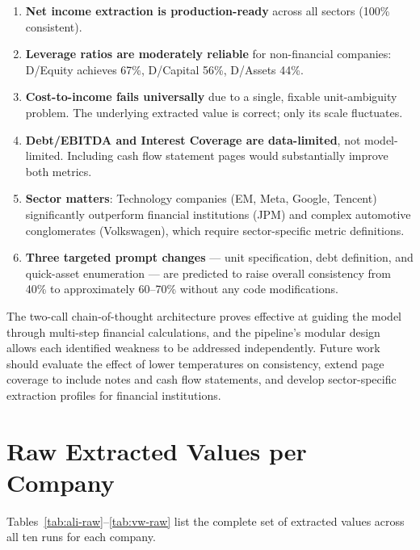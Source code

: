 \documentclass[12pt, a4paper]{article}
\begin{document}
\begin{enumerate}
  \item \textbf{Net income extraction is production-ready} across all sectors
        (100\% consistent).
  \item \textbf{Leverage ratios are moderately reliable} for non-financial
        companies: D/Equity achieves 67\%, D/Capital 56\%, D/Assets 44\%.
  \item \textbf{Cost-to-income fails universally} due to a single, fixable
        unit-ambiguity problem.  The underlying extracted value is correct;
        only its scale fluctuates.
  \item \textbf{Debt/EBITDA and Interest Coverage are data-limited}, not
        model-limited.  Including cash flow statement pages would
        substantially improve both metrics.
  \item \textbf{Sector matters}: Technology companies (EM, Meta, Google,
        Tencent) significantly outperform financial institutions (JPM) and
        complex automotive conglomerates (Volkswagen), which require
        sector-specific metric definitions.
  \item \textbf{Three targeted prompt changes} --- unit specification, debt
        definition, and quick-asset enumeration --- are predicted to raise
        overall consistency from 40\% to approximately 60--70\% without any
        code modifications.
\end{enumerate}

The two-call chain-of-thought architecture proves effective at guiding the
model through multi-step financial calculations, and the pipeline's modular
design allows each identified weakness to be addressed independently.  Future
work should evaluate the effect of lower temperatures on consistency, extend
page coverage to include notes and cash flow statements, and develop
sector-specific extraction profiles for financial institutions.

\appendix
\section{Raw Extracted Values per Company}
\label{app:raw}

Tables~\ref{tab:ali-raw}--\ref{tab:vw-raw} list the complete set of extracted
values across all ten runs for each company.
\end{document}
